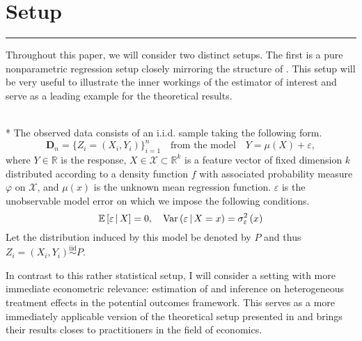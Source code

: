 \section{Setup}\label{sec:setup}
\hrule
Throughout this paper, we will consider two distinct setups.
The first is a pure nonparametric regression setup closely mirroring the structure of \citet{demirkaya_optimal_2024}.
This setup will be very useful to illustrate the inner workings of the estimator of interest and serve as a leading example for the theoretical results.
\begin{boxD}
	\begin{asm}\label{asm:npr_dgp}\mbox{}\\*
		The observed data consists of an i.i.d. sample taking the following form.
		\begin{equation}\label{DGP1}
			\mathbf{D}_n = \{Z_{i} = (X_{i}, Y_{i})\}_{i = 1}^{n}
			\quad \text{from the model} \quad
			Y = \mu(X) + \varepsilon,
		\end{equation}
		where $Y \in \mathbb{R}$ is the response, $X \in \mathcal{X} \subset \mathbb{R}^k$ is a feature vector of fixed dimension $k$ distributed according to a density function $f$ with associated probability measure $\varphi$ on $\mathcal{X}$, and $\mu(x)$ is the unknown mean regression function.
		$\varepsilon$ is the unobservable model error on which we impose the following conditions.
		\begin{equation}
			\mathbb{E}\left[\varepsilon \, \middle| \, X\right] = 0, \quad
			\text{Var}\left(\varepsilon \, \middle| \, X = x\right) = \sigma_{\varepsilon}^2\left(x\right)
		\end{equation}
		Let the distribution induced by this model be denoted by $P$ and thus $Z_{i} = \left(X_{i}, Y_{i}\right) \overset{\text{iid}}{\sim} P$.
	\end{asm}
\end{boxD}
In contrast to this rather statistical setup, I will consider a setting with more immediate econometric relevance: estimation of and inference on heterogeneous treatment effects in the potential outcomes framework.
This serves as a more immediately applicable version of the theoretical setup presented in \citet{ritzwoller_uniform_2024} and brings their results closes to practitioners in the field of economics.
